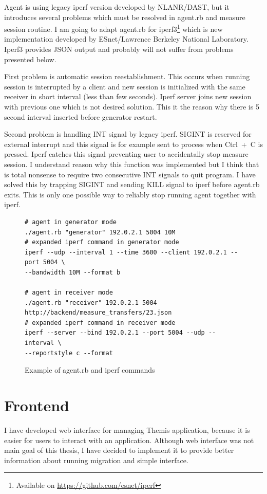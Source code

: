 Agent is using legacy iperf version developed by NLANR/DAST, but it introduces several problems which must be resolved in agent.rb and measure session routine. I am going to adapt agent.rb for iperf3\footnote{Available on \url{https://github.com/esnet/iperf}} which is new implementation developed by ESnet/Lawrence Berkeley National Laboratory. Iperf3 provides \Ac{JSON} output and probably will not suffer from problems presented below.

First problem is automatic session reestablishment. This occurs when running session is interrupted by a client and new session is initialized with the same receiver in short interval (less than few seconds). Iperf server joins new session with previous one which is not desired solution. This it the reason why there is 5 second interval inserted before generator restart. 

Second problem is handling INT signal by legacy iperf. SIGINT is reserved for external interrupt and this signal is for example sent to process when \mbox{Ctrl + C} is pressed. Iperf catches this signal preventing user to accidentally stop measure session. I understand reason why this function was implemented but I think that is total nonsense to require two consecutive INT signals to quit program. I have solved this by trapping SIGINT and sending KILL signal to iperf before agent.rb exits. This is only one possible way to reliably stop running agent together with iperf.

\begin{figure}[htb]
\caption{Example of agent.rb and iperf commands}
\label{code:fw}
\begin{verbatim}
# agent in generator mode
./agent.rb "generator" 192.0.2.1 5004 10M
# expanded iperf command in generator mode
iperf --udp --interval 1 --time 3600 --client 192.0.2.1 --port 5004 \
--bandwidth 10M --format b
	
# agent in receiver mode
./agent.rb "receiver" 192.0.2.1 5004 http://backend/measure_transfers/23.json
# expanded iperf command in receiver mode
iperf --server --bind 192.0.2.1 --port 5004 --udp --interval \
--reportstyle c --format
\end{verbatim}
\end{figure}


\section{Frontend}
I have developed web interface for managing Themis application, because it is easier for users to interact with an application. Although web interface was not main goal of this thesis, I have decided to implement it to provide better information about running migration and simple interface.

